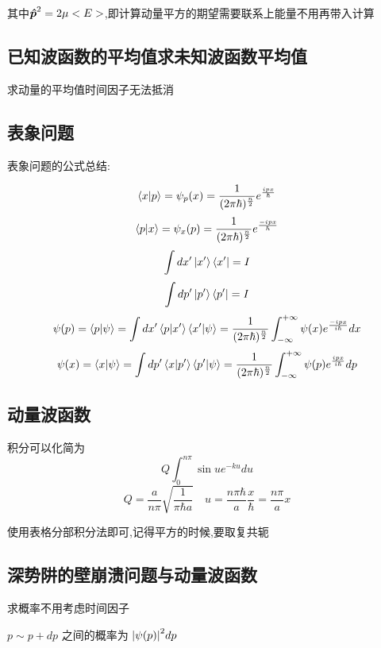 \documentclass{article}
\begin{document}
            其中$\vu*{p}^{2} = 2\mu<E>$,即计算动量平方的期望需要联系上能量不用再带入计算

        \subsection{已知波函数的平均值求未知波函数平均值}
            求动量的平均值时间因子无法抵消
        
        \subsection{表象问题}

            \begin{formal}

                表象问题的公式总结:

                $$ \braket{x}{p} = \psi_{p} (x) = \frac{1}{(2 \pi \hbar)^{\frac{n}{2}}} e^{\frac{ipx}{\hbar}} $$ 
                $$ \braket{p}{x} = \psi_{x} (p) = \frac{1}{(2 \pi \hbar)^{\frac{n}{2}}} e^{\frac{-ipx}{\hbar}} $$ 
                $$ \int dx' \ket{x'} \bra{x'} = I $$ 
                $$ \int dp' \ket{p'} \bra{p'} = I $$ 
                $$ \psi(p) = \braket{p}{\psi} = \int dx' \braket{p}{x'} \braket{x'}{\psi} = \frac{1}{(2 \pi \hbar)^{\frac{n}{2}}} \int_{-\infty}^{+\infty} \psi(x) e^{\frac{-ipx}{i\hbar}} dx $$
                $$ \psi(x) = \braket{x}{\psi} = \int dp' \braket{x}{p'} \braket{p'}{\psi} = \frac{1}{(2 \pi \hbar)^{\frac{n}{2}}} \int_{-\infty}^{+\infty} \psi(p) e^{\frac{ipx}{i\hbar}}  dp $$
            \end{formal}
                

        \subsection{动量波函数}
            积分可以化简为
            $$ Q \int_{0}^{n \pi} \sin{u} e^{-ku} du $$
            $$ Q = \frac{a}{n\pi} \sqrt{\frac{1}{\pi \hbar a}} \quad u = \frac{n \pi \hbar}{a} \frac{x}{\hbar}  = \frac{n \pi}{a} x $$
            
            使用表格分部积分法即可,记得平方的时候,要取复共轭
           


        \subsection{深势阱的壁崩溃问题与动量波函数}
            求概率不用考虑时间因子
            
            $ p \sim p+dp $ 之间的概率为 $ \abs{\psi(p)}^{2} dp $      
\end{document}
